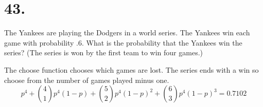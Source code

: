 \section*{43.}
The Yankees are playing the Dodgers in a world series. The Yankees win each
game with probability .6. What is the probability that the Yankees win the
series? (The series is won by the first team to win four games.)

\bigskip
\noindent
The choose function chooses which games are lost.
The series ends with a win so choose from the number of games played minus one.
$$p^4+{4\choose1}p^4(1-p)+{5\choose2}p^4(1-p)^2+{6\choose3}p^4(1-p)^3=0.7102$$



